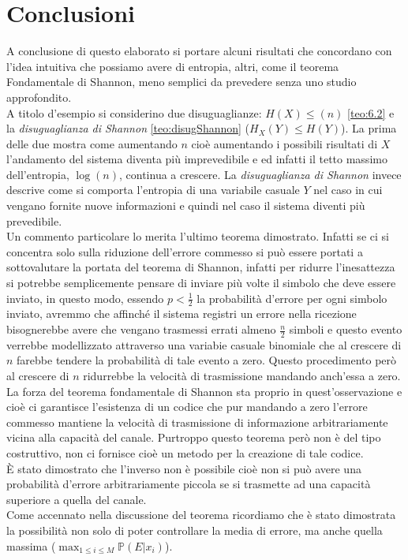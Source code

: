 \chapter{Conclusioni}
\label{cha:conclusioni}
A conclusione di questo elaborato si portare alcuni risultati che concordano con l'idea intuitiva che possiamo avere di entropia, altri, come il teorema Fondamentale di Shannon, meno semplici da prevedere senza uno studio approfondito.\\
A titolo d'esempio si considerino due disuguaglianze: $H(X)\leq(n)$ \ref{teo:6.2} e la \textit{disuguaglianza di Shannon} \ref{teo:disugShannon} ($H_X(Y)\leq H(Y)$). La prima delle due mostra come aumentando $n$ cioè aumentando i possibili risultati di $X$ l'andamento  del sistema diventa più imprevedibile e ed infatti il tetto massimo dell'entropia, $\log(n)$, continua a crescere. La \textit{disuguaglianza di Shannon} invece descrive come si comporta l'entropia di una variabile casuale $Y$ nel caso in cui vengano fornite nuove informazioni e quindi nel caso il sistema diventi più prevedibile.\\ 
Un commento particolare lo merita l'ultimo teorema dimostrato. Infatti se ci si concentra solo sulla riduzione dell'errore commesso si può essere portati a sottovalutare la portata del teorema di Shannon, infatti per ridurre l'inesattezza si potrebbe semplicemente pensare di inviare più volte il simbolo che deve essere inviato, in questo modo, essendo $p<\frac{1}{2}$ la probabilità d'errore per ogni simbolo inviato, avremmo che affinché il sistema registri un errore nella ricezione bisognerebbe avere che vengano trasmessi errati almeno $\frac{n}{2}$ simboli e questo evento verrebbe modellizzato attraverso una variabie casuale binomiale che al crescere di $n$ farebbe tendere la probabilità di tale evento a zero. Questo procedimento però al crescere di $n$ ridurrebbe la velocità di trasmissione mandando anch'essa a zero. La forza del teorema fondamentale di Shannon sta proprio in quest'osservazione e cioè ci garantisce l'esistenza di un codice che pur mandando a zero l'errore commesso mantiene la velocità di trasmissione di informazione arbitrariamente vicina alla capacità del canale. Purtroppo questo teorema però non è del tipo costruttivo, non ci fornisce cioè un metodo per la creazione di tale codice.\\
È stato dimostrato che l'inverso non è possibile cioè non si può avere una probabilità d'errore arbitrariamente piccola se si trasmette ad una capacità superiore a quella del canale.\\
Come accennato nella discussione del teorema ricordiamo che  è stato dimostrata la possibilità non solo di poter controllare la media di errore, ma anche quella massima ($\max_{1\leq i \leq M} \mathbb{P}(E|x_i)$).\\







